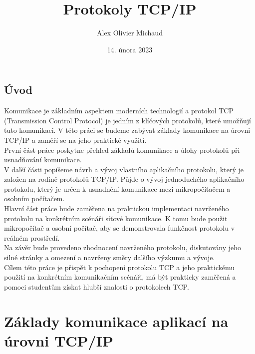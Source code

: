 \documentclass[12pt]{report}			%
\author{Alex Olivier Michaud}
\title{Protokoly TCP/IP}
\date{14. února 2023}
\begin{document}
	\mytitlepage						%
	
	
	\abstrakt{
		\lipsum[1]						%
	}{
		\lipsum[1]						%
	}
	
	\podekovani{
		\lipsum[2]						%
	}
	
   {\tableofcontents\newpage}			%
	
\addtocounter{page}{1}		%
	\chapter*{Úvod}
	
	Komunikace je základním aspektem moderních technologií a protokol TCP (Transmission Control Protocol) je jedním z klíčových protokolů, které umožňují tuto komunikaci. V této práci se budeme zabývat základy komunikace na úrovni TCP/IP a zaměří se na jeho praktické využití.
\\
První část práce poskytne přehled základů komunikace a úlohy protokolů při usnadňování komunikace.
\\
V další části popíšeme návrh a vývoj vlastního aplikačního protokolu, který je založen na rodině protokolů TCP/IP. Půjde o vývoj jednoduchého aplikačního protokolu, který je určen k usnadnění komunikace mezi mikropočítačem a osobním počítačem.
\\
Hlavní část práce bude zaměřena na praktickou implementaci navrženého protokolu na konkrétním scénáři síťové komunikace. K tomu bude použit mikropočítač a osobní počítač, aby se demonstrovala funkčnost protokolu v reálném prostředí.
\\
Na závěr bude provedeno zhodnocení navrženého protokolu, diskutovány jeho silné stránky a omezení a navrženy směry dalšího výzkumu a vývoje.
\\
Cílem této práce je přispět k pochopení protokolu TCP a jeho praktickému použití na konkrétním komunikačním scénáři, má být prakticky zaměřená a pomoci studentům získat hlubší znalosti o protokolech TCP.	
	
	
	\part{Základy komunikace aplikací na úrovni TCP/IP}
	
\end{document}
